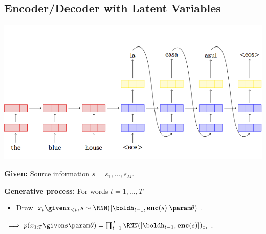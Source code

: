 \subsection{Encoder/Decoder with Latent Variables}

\newcommand{\benc}{\boldsymbol{\mathrm{enc}}}

\begin{frame}
\begin{center}
\includegraphics[scale=0.55]{pics/seq2seq.png}
\end{center}

\textbf{Given:} Source information $s = s_1, \ldots, s_M$.
\air

\textbf{Generative process:} For words $t=1, \ldots, T$
  \begin{itemize}
      \item Draw $x_{t} \given x_{< t}, s \sim \RNN([\boldh_{t-1}, \benc(s)] \param \theta)$.
  \end{itemize}




\air
$ \implies  p(x_{1:T} \given s \param \theta) =  \prod_{t=1}^T \RNN([ \boldh_{t-1}, \benc(s)])_{x_t}$.
\end{frame}

